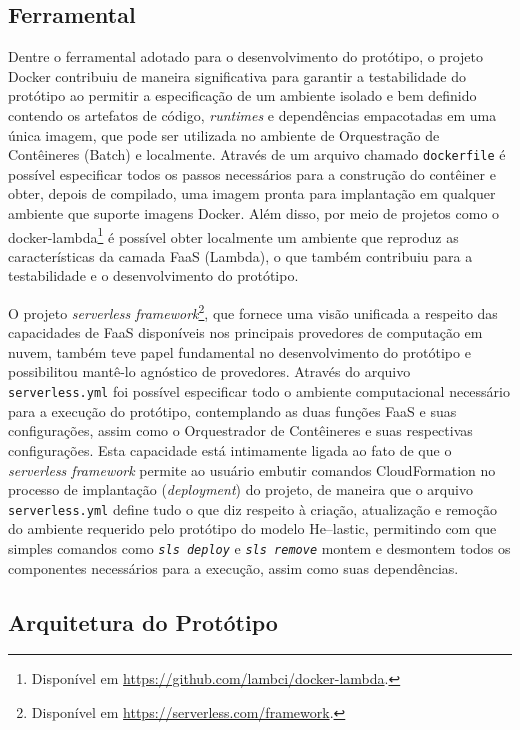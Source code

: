\documentclass[english,brazilian]{UNISINOSmonografia} %
\begin{document}
\subsection{Ferramental}
Dentre o ferramental adotado para o desenvolvimento do protótipo, o projeto Docker contribuiu de maneira significativa para garantir a testabilidade do protótipo ao permitir a especificação de um ambiente isolado e bem definido contendo os artefatos de código, \textit{runtimes} e dependências empacotadas em uma única imagem, que pode ser utilizada no ambiente de Orquestração de Contêineres (Batch) e localmente.
%
Através de um arquivo chamado \texttt{dockerfile} é possível especificar todos os passos necessários para a construção do contêiner e obter, depois de compilado, uma imagem pronta para implantação em qualquer ambiente que suporte imagens Docker.
%
Além disso, por meio de projetos como o docker-lambda\footnote{
	Disponível em \url{https://github.com/lambci/docker-lambda}.
} é possível obter localmente um ambiente que reproduz as características da camada FaaS (Lambda), o que também contribuiu para a testabilidade e o desenvolvimento do protótipo.


O projeto \textit{serverless framework}\footnote{
	Disponível em \url{https://serverless.com/framework}.
}, que fornece uma visão unificada a respeito das capacidades de FaaS disponíveis nos principais provedores de computação em nuvem, também teve papel fundamental no desenvolvimento do protótipo e possibilitou mantê-lo agnóstico de provedores.
%
Através do arquivo \texttt{serverless.yml} foi possível especificar todo o ambiente computacional necessário para a execução do protótipo, contemplando as duas funções FaaS e suas configurações, assim como o Orquestrador de Contêineres e suas respectivas configurações.
%
Esta capacidade está intimamente ligada ao fato de que o \textit{serverless framework} permite ao usuário embutir comandos CloudFormation no processo de implantação (\textit{deployment}) do projeto, de maneira que o arquivo \texttt{serverless.yml} define tudo o que diz respeito à criação, atualização e remoção do ambiente requerido pelo protótipo do modelo \textsf{He}--lastic, permitindo com que simples comandos como \texttt{\textit{sls deploy}} e \texttt{\textit{sls remove}} montem e desmontem todos os componentes necessários para a execução, assim como suas dependências.






\subsection{Arquitetura do Protótipo}
\end{document}
